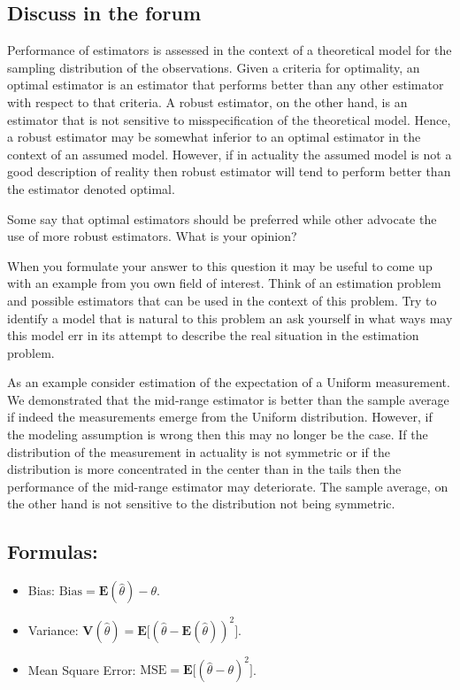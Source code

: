 \documentclass[
]{krantz}
\newcommand{\Expec}{\mathbf{E}}
\newcommand{\Var}{\mathbf{V}}
\theoremstyle{definition}
\theoremstyle{definition}
\theoremstyle{definition}
\theoremstyle{remark}
\begin{document}
\hypertarget{discuss-in-the-forum}{%
\subsection*{Discuss in the forum}\label{discuss-in-the-forum}}


Performance of estimators is assessed in the context of a theoretical
model for the sampling distribution of the observations. Given a
criteria for optimality, an optimal estimator is an estimator that
performs better than any other estimator with respect to that criteria.
A robust estimator, on the other hand, is an estimator that is not
sensitive to misspecification of the theoretical model. Hence, a robust
estimator may be somewhat inferior to an optimal estimator in the
context of an assumed model. However, if in actuality the assumed model
is not a good description of reality then robust estimator will tend to
perform better than the estimator denoted optimal.

Some say that optimal estimators should be preferred while other
advocate the use of more robust estimators. What is your opinion?

When you formulate your answer to this question it may be useful to come
up with an example from you own field of interest. Think of an
estimation problem and possible estimators that can be used in the
context of this problem. Try to identify a model that is natural to this
problem an ask yourself in what ways may this model err in its attempt
to describe the real situation in the estimation problem.

As an example consider estimation of the expectation of a Uniform
measurement. We demonstrated that the mid-range estimator is better than
the sample average if indeed the measurements emerge from the Uniform
distribution. However, if the modeling assumption is wrong then this may
no longer be the case. If the distribution of the measurement in
actuality is not symmetric or if the distribution is more concentrated
in the center than in the tails then the performance of the mid-range
estimator may deteriorate. The sample average, on the other hand is not
sensitive to the distribution not being symmetric.

\hypertarget{formulas}{%
\subsection*{Formulas:}\label{formulas}}


\begin{itemize}
\item
  Bias: \(\mathrm{Bias} = \Expec(\hat \theta) - \theta\).
\item
  Variance:
  \(\Var(\hat \theta) = \Expec\big[(\hat \theta - \Expec(\hat\theta))^2\big]\).
\item
  Mean Square Error:
  \(\mathrm{MSE} = \Expec\big[(\hat \theta - \theta)^2\big]\).
\end{itemize}
\end{document}
